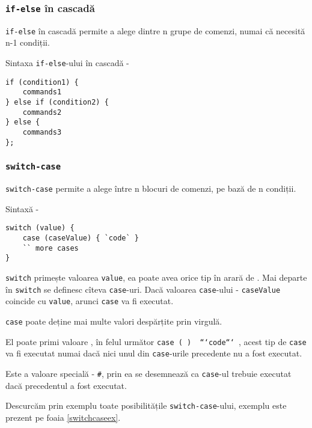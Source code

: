 \subsubsection{\texttt{if-else} în cascadă}

\texttt{if-else} în cascadă permite a alege dintre n grupe de comenzi, numai că necesită n-1 condiții.

Sintaxa \texttt{if-else}-ului în cascadă -
\begin{verbatim}
if (condition1) {
	commands1
} else if (condition2) {
	commands2
} else {
	commands3
};
\end{verbatim}

\subsubsection{\texttt{switch-case}}

\texttt{switch-case} permite a alege între n blocuri de comenzi, pe bază de n condiții.

Sintaxă -
\begin{verbatim}
switch (value) {
	case (caseValue) { `code` }
	`` more cases
}
\end{verbatim}

\texttt{switch} primește valoarea \texttt{value}, ea poate avea orice tip în arară de \bool. Mai departe în \texttt{switch} se definesc cîteva \texttt{case}-uri. Dacă valoarea \texttt{case}-ului - \texttt{caseValue} coincide cu \texttt{value}, arunci \texttt{case} va fi executat.

\texttt{case} poate deține mai multe valori despărțite prin virgulă.

El poate primi valoare \void, în felul următor \texttt{case (~) { ```code``` }}, acest tip de \texttt{case} va fi executat numai dacă nici unul din \texttt{case}-urile precedente nu a fost executat.

Este a valoare specială - \texttt{#}, prin ea se desemnează ca \texttt{case}-ul trebuie executat dacă precedentul a fost executat.

Descurcăm prin exemplu toate posibilitățile \texttt{switch-case}-ului, exemplu este prezent pe foaia \ref{switchcaseex}.

\begin{sourcecode}
\label{switchcaseex}
\inputminted[linenos]{icl}{../sources/switchcaseex.icL}
\end{sourcecode}

